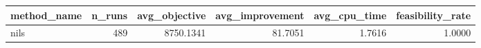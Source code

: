 \begin{tabular}{lrrrrr}
\toprule
method_name & n_runs & avg_objective & avg_improvement & avg_cpu_time & feasibility_rate \\
\midrule
nils & 489 & 8750.1341 & 81.7051 & 1.7616 & 1.0000 \\
\bottomrule
\end{tabular}
